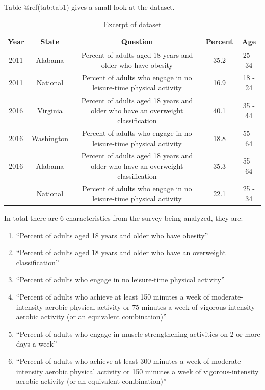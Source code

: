 \documentclass[
]{article}
\begin{document}
Table @ref(tab:tab1) gives a small look at the dataset.

\begin{table}[!h]

\caption{\label{tab:tab1}Excerpt of dataset}
\centering
\begin{tabular}[t]{ccccc}
\toprule
Year & State & Question & Percent & Age\\
\midrule
2011 & Alabama & Percent of adults aged 18 years and older who have obesity & 35.2 & 25 - 34\\
2011 & National & Percent of adults who engage in no leisure-time physical activity & 16.9 & 18 - 24\\
2016 & Virginia & Percent of adults aged 18 years and older who have an overweight classification & 40.1 & 35 - 44\\
2016 & Washington & Percent of adults who engage in no leisure-time physical activity & 18.8 & 55 - 64\\
2016 & Alabama & Percent of adults aged 18 years and older who have an overweight classification & 35.3 & 55 - 64\\
\addlinespace
2011 & National & Percent of adults who engage in no leisure-time physical activity & 22.1 & 25 - 34\\
\bottomrule
\end{tabular}
\end{table}

In total there are 6 characteristics from the survey being analyzed,
they are:

\begin{enumerate}
\def\labelenumi{\arabic{enumi}.}
\item
  ``Percent of adults aged 18 years and older who have obesity''\\
\item
  ``Percent of adults aged 18 years and older who have an overweight
  classification''\\
\item
  ``Percent of adults who engage in no leisure-time physical
  activity''\\
\item
  ``Percent of adults who achieve at least 150 minutes a week of
  moderate-intensity aerobic physical activity or 75 minutes a week of
  vigorous-intensity aerobic activity (or an equivalent combination)''
\item
  ``Percent of adults who engage in muscle-strengthening activities on 2
  or more days a week''\\
\item
  ``Percent of adults who achieve at least 300 minutes a week of
  moderate-intensity aerobic physical activity or 150 minutes a week of
  vigorous-intensity aerobic activity (or an equivalent combination)''
\end{enumerate}
\end{document}
